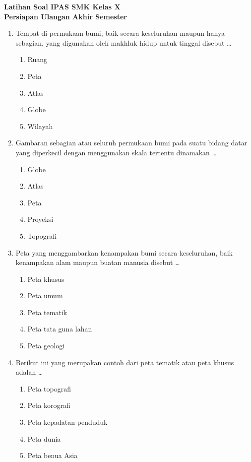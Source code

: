 \documentclass[12pt,a4paper]{article}
\begin{document}
\begin{center}
    \textbf{\Large Latihan Soal IPAS SMK Kelas X} \\
    \textbf{Persiapan Ulangan Akhir Semester}
\end{center}
\vspace{0.5cm}

\begin{enumerate}[leftmargin=*]

\item Tempat di permukaan bumi, baik secara keseluruhan maupun hanya sebagian, yang digunakan oleh makhluk hidup untuk tinggal disebut \dots
    \begin{enumerate}[label=\alph*.]
        \item Ruang
        \item Peta
        \item Atlas
        \item Globe
        \item Wilayah
    \end{enumerate}

\item Gambaran sebagian atau seluruh permukaan bumi pada suatu bidang datar yang diperkecil dengan menggunakan skala tertentu dinamakan \dots
    \begin{enumerate}[label=\alph*.]
        \item Globe
        \item Atlas
        \item Peta
        \item Proyeksi
        \item Topografi
    \end{enumerate}

\item Peta yang menggambarkan kenampakan bumi secara keseluruhan, baik kenampakan alam maupun buatan manusia disebut \dots
    \begin{enumerate}[label=\alph*.]
        \item Peta khusus
        \item Peta umum
        \item Peta tematik
        \item Peta tata guna lahan
        \item Peta geologi
    \end{enumerate}

\item Berikut ini yang merupakan contoh dari peta tematik atau peta khusus adalah \dots
    \begin{enumerate}[label=\alph*.]
        \item Peta topografi
        \item Peta korografi
        \item Peta kepadatan penduduk
        \item Peta dunia
        \item Peta benua Asia
    \end{enumerate}


\end{enumerate}
\end{document}
